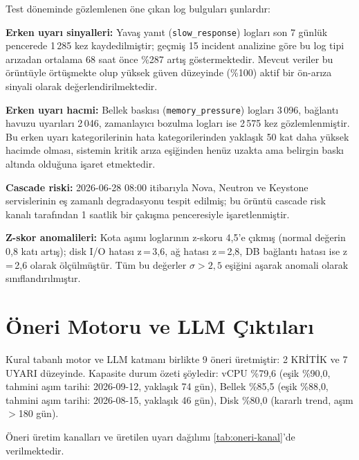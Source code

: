 Test döneminde gözlemlenen öne çıkan log bulguları şunlardır:

\begin{maddelendir}[label=--]
    \item \textbf{Erken uyarı sinyalleri:}
    Yavaş yanıt (\texttt{slow\_response}) logları son 7 günlük pencerede 1\,285 kez kaydedilmiştir; geçmiş 15 incident analizine göre bu log tipi arızadan ortalama 68 saat önce \%287 artış göstermektedir.
    Mevcut veriler bu örüntüyle örtüşmekte olup yüksek güven düzeyinde (\%100) aktif bir ön-arıza sinyali olarak değerlendirilmektedir.

    \item \textbf{Erken uyarı hacmi:}
    Bellek baskısı (\texttt{memory\_pressure}) logları 3\,096, bağlantı havuzu uyarıları 2\,046, zamanlayıcı bozulma logları ise 2\,575 kez gözlemlenmiştir.
    Bu erken uyarı kategorilerinin hata kategorilerinden yaklaşık 50 kat daha yüksek hacimde olması, sistemin kritik arıza eşiğinden henüz uzakta ama belirgin baskı altında olduğuna işaret etmektedir.

    \item \textbf{Cascade riski:}
    2026-06-28 08:00 itibarıyla Nova, Neutron ve Keystone servislerinin eş zamanlı degradasyonu tespit edilmiş; bu örüntü cascade risk kanalı tarafından 1 saatlik bir çakışma penceresiyle işaretlenmiştir.

    \item \textbf{Z-skor anomalileri:}
    Kota aşımı loglarının z-skoru 4{,}5'e çıkmış (normal değerin 0{,}8 katı artış); disk I/O hatası z\,=\,3{,}6, ağ hatası z\,=\,2{,}8, DB bağlantı hatası ise z\,=\,2{,}6 olarak ölçülmüştür.
    Tüm bu değerler $\sigma > 2{,}5$ eşiğini aşarak anomali olarak sınıflandırılmıştır.
\end{maddelendir}


\section{Öneri Motoru ve LLM Çıktıları}
\label{sec:bulgu-oneri}

Kural tabanlı motor ve LLM katmanı birlikte 9 öneri üretmiştir: 2 KRİTİK ve 7 UYARI düzeyinde.
Kapasite durum özeti şöyledir: vCPU \%79{,}6 (eşik \%90{,}0, tahmini aşım tarihi: 2026-09-12, yaklaşık 74 gün), Bellek \%85{,}5 (eşik \%88{,}0, tahmini aşım tarihi: 2026-08-15, yaklaşık 46 gün), Disk \%80{,}0 (kararlı trend, aşım $>$180 gün).

Öneri üretim kanalları ve üretilen uyarı dağılımı \autoref{tab:oneri-kanal}'de verilmektedir.

